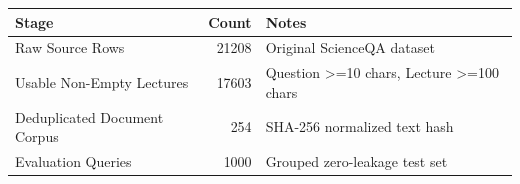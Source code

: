 \begin{tabular}{lrl}
\toprule
Stage & Count & Notes \\
\midrule
Raw Source Rows & 21208 & Original ScienceQA dataset \\
Usable Non-Empty Lectures & 17603 & Question >=10 chars, Lecture >=100 chars \\
Deduplicated Document Corpus & 254 & SHA-256 normalized text hash \\
Evaluation Queries & 1000 & Grouped zero-leakage test set \\
\bottomrule
\end{tabular}
